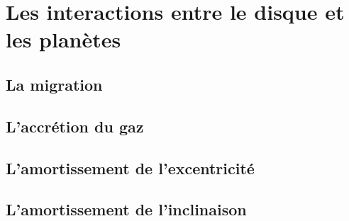 \documentclass[a4paper,twoside]{article}
\begin{document}
\section{Les interactions entre le disque et les planètes}
\subsection{La migration}

\subsection{L'accrétion du gaz}

\subsection{L'amortissement de l'excentricité}%

\subsection{L'amortissement de l'inclinaison}%








\end{document}
